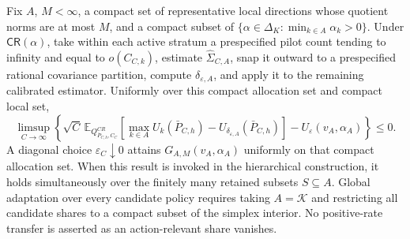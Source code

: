 Fix \(A\), \(M<\infty\), a compact set of representative local directions whose quotient norms are at most \(M\), and a compact subset of \(\{\alpha\in\Delta_K:\min_{k\in A}\alpha_k>0\}\).  Under \(\mathsf{CR}(\alpha)\), take within each active stratum a prespecified pilot count tending to infinity and equal to \(o(C_{C,k})\), estimate \(\widehat\Sigma_{C,A}\), snap it outward to a prespecified rational covariance partition, compute \(\delta_{\varepsilon,A}\), and apply it to the remaining calibrated estimator.  Uniformly over this compact allocation set and compact local set,
\[
\limsup_{C\to\infty}\left\{\sqrt C\,\mathbb E_{Q^{CR}_{\bar P_{C,h},C_C}}
\left[\max_{k\in A}U_k(\bar P_{C,h})-U_{\delta_{\varepsilon,A}}(\bar P_{C,h})\right]
-U_\varepsilon(v_A,\alpha_A)\right\}\leq0.
\]
A diagonal choice \(\varepsilon_C\downarrow0\) attains \(G_{A,M}(v_A,\alpha_A)\) uniformly on that compact allocation set.  When this result is invoked in the hierarchical construction, it holds simultaneously over the finitely many retained subsets \(S\subseteq A\).  Global adaptation over every candidate policy requires taking \(A=\mathcal K\) and restricting all candidate shares to a compact subset of the simplex interior.  No positive-rate transfer is asserted as an action-relevant share vanishes.